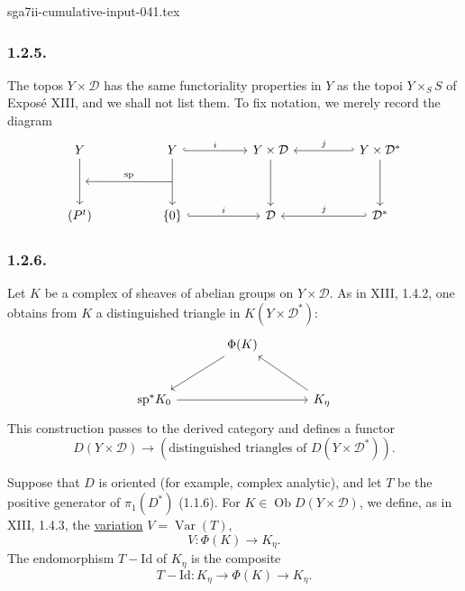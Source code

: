 \begin{filecontents*}{sga7ii-cumulative-input-041.tex}
\subsubsection*{1.2.5.}
The topos $Y\times\mathcal D$ has the same functoriality properties
in $Y$ as the topoi $Y\times_S S$ of Expos\'e XIII, and we shall not
list them.  To fix notation, we merely record the diagram
\[
\begin{tikzcd}[row sep=huge, column sep=huge]
Y \arrow[d, ""{name=A}]
  & Y \arrow[d, ""{name=B}] \arrow[r, hook, "i"]
  & Y\times\mathcal D \arrow[d]
  & Y\times\mathcal D^* \arrow[d] \arrow[l, hook', "j"'] \\
(P^t)
  & \{0\} \arrow[r, hook, "i"]
  & \mathcal D
  & \mathcal D^* \arrow[l, hook', "j"']
    \arrow[from=B, to=A, "\mathrm{sp}"']
\end{tikzcd}
\]

\subsubsection*{1.2.6.}
Let $K$ be a complex of sheaves of abelian groups on
$Y\times\mathcal D$.  As in XIII, 1.4.2, one obtains from $K$ a
distinguished triangle in $K(Y\times\mathcal D^*)$:
\[
\begin{tikzcd}[row sep=large, column sep=large]
{} & \Phi(K) \arrow[dl] & {} \\
\mathrm{sp}^*K_0 \arrow[rr] & {} & K_\eta \arrow[ul]
\end{tikzcd}
\]
This construction passes to the derived category and defines a
functor
\[
D(Y\times\mathcal D)
\longrightarrow
(\text{distinguished triangles of }D(Y\times\mathcal D^*)).
\]

Suppose that $D$ is oriented (for example, complex analytic), and
let $T$ be the positive generator of $\pi_1(D^*)$ (1.1.6).  For
$K\in\operatorname{Ob}D(Y\times\mathcal D)$, we define, as in XIII,
1.4.3, the \underline{variation} $V=\operatorname{Var}(T)$,
\[
V:\Phi(K)\longrightarrow K_\eta.
\]
The endomorphism $T-\mathrm{Id}$ of $K_\eta$ is the composite
\[
T-\mathrm{Id}:K_\eta\longrightarrow\Phi(K)
\longrightarrow K_\eta.
\]

\end{filecontents*}
